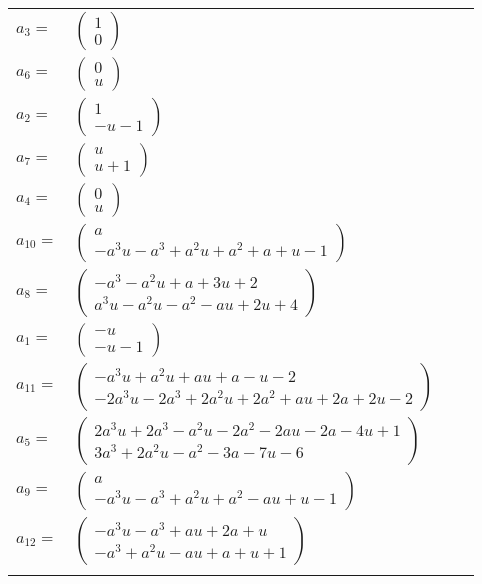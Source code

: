 \documentclass[1p]{elsarticle_modified}
\theoremstyle{definition}
\begin{document}
\begin{tabular}{m{7pt} m{180pt} m{7pt} m{180pt} }
\flushright $a_{3}=$&$\begin{pmatrix}1\\0\end{pmatrix}$ \\
\flushright $a_{6}=$&$\begin{pmatrix}0\\u\end{pmatrix}$ \\
\flushright $a_{2}=$&$\begin{pmatrix}1\\- u-1\end{pmatrix}$ \\
\flushright $a_{7}=$&$\begin{pmatrix}u\\u+1\end{pmatrix}$ \\
\flushright $a_{4}=$&$\begin{pmatrix}0\\u\end{pmatrix}$ \\
\flushright $a_{10}=$&$\begin{pmatrix}a\\- a^3 u- a^3+a^2 u+a^2+a+u-1\end{pmatrix}$ \\
\flushright $a_{8}=$&$\begin{pmatrix}- a^3- a^2 u+a+3 u+2\\a^3 u- a^2 u- a^2- a u+2 u+4\end{pmatrix}$ \\
\flushright $a_{1}=$&$\begin{pmatrix}- u\\- u-1\end{pmatrix}$ \\
\flushright $a_{11}=$&$\begin{pmatrix}- a^3 u+a^2 u+a u+a- u-2\\-2 a^3 u-2 a^3+2 a^2 u+2 a^2+a u+2 a+2 u-2\end{pmatrix}$ \\
\flushright $a_{5}=$&$\begin{pmatrix}2 a^3 u+2 a^3- a^2 u-2 a^2-2 a u-2 a-4 u+1\\3 a^3+2 a^2 u- a^2-3 a-7 u-6\end{pmatrix}$ \\
\flushright $a_{9}=$&$\begin{pmatrix}a\\- a^3 u- a^3+a^2 u+a^2- a u+u-1\end{pmatrix}$ \\
\flushright $a_{12}=$&$\begin{pmatrix}- a^3 u- a^3+a u+2 a+u\\- a^3+a^2 u- a u+a+u+1\end{pmatrix}$\\&\end{tabular}
\end{document}
